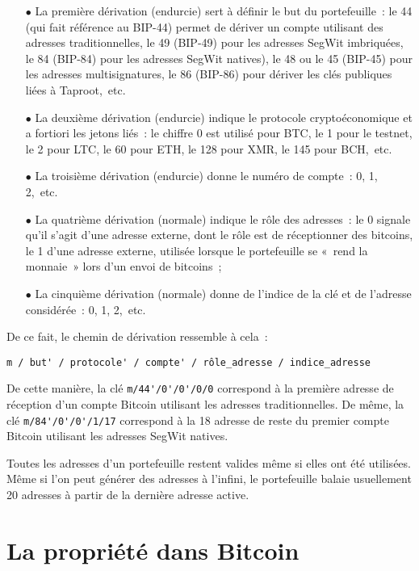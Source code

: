 \begin{itemize}
  \item[$\bullet$] La première dérivation (endurcie) sert à définir le but du portefeuille~: le 44 (qui fait référence au BIP-44) permet de dériver un compte utilisant des adresses traditionnelles, le 49 (BIP-49) pour les adresses SegWit imbriquées, le 84 (BIP-84) pour les adresses SegWit natives), le 48 ou le 45 (BIP-45) pour les adresses multisignatures, le 86 (BIP-86) pour dériver les clés publiques liées à Taproot,~etc.
  \item[$\bullet$] La deuxième dérivation (endurcie) indique le protocole cryptoéconomique et a fortiori les jetons liés~: le chiffre 0 est utilisé pour BTC, le 1 pour le testnet, le 2 pour LTC, le 60 pour ETH, le 128 pour XMR, le 145 pour BCH,~etc.
  \item[$\bullet$] La troisième dérivation (endurcie) donne le numéro de compte~: 0, 1, 2,~etc.
  \item[$\bullet$] La quatrième dérivation (normale) indique le rôle des adresses~: le 0 signale qu'il s'agit d'une adresse externe, dont le rôle est de réceptionner des bitcoins, le 1 d'une adresse externe, utilisée lorsque le portefeuille se «~rend la monnaie~» lors d'un envoi de bitcoins~;
  \item[$\bullet$] La cinquième dérivation (normale) donne de l'indice de la clé et de l'adresse considérée~: 0, 1, 2,~etc.
\end{itemize}

De ce fait, le chemin de dérivation ressemble à cela~:

\begin{Verbatim}[fontsize=\footnotesize]
m / but' / protocole' / compte' / rôle_adresse / indice_adresse
\end{Verbatim}

De cette manière, la clé \verb?m/44'/0'/0'/0/0? correspond à la première adresse de réception d'un compte Bitcoin utilisant les adresses traditionnelles. De même, la clé \verb?m/84'/0'/0'/1/17? correspond à la 18\ieme{} adresse de reste du premier compte Bitcoin utilisant les adresses SegWit natives.

Toutes les adresses d'un portefeuille restent valides même si elles ont été utilisées. Même si l'on peut générer des adresses à l'infini, le portefeuille balaie usuellement 20 adresses à partir de la dernière adresse active.

\section*{La propriété dans Bitcoin}

